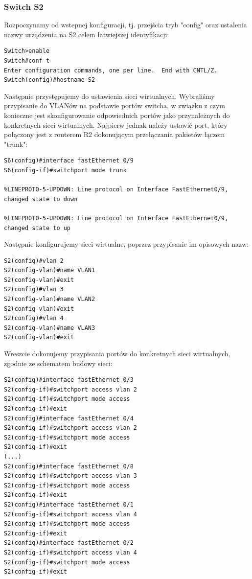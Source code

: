 \documentclass[polish,11pt,a4paper,twoside]{article}
\begin{document}
\subsubsection{Switch S2}

Rozpoczynamy od wstepnej konfiguracji, tj. przejścia tryb "config" oraz ustalenia nazwy urządzenia na S2 celem łatwiejszej identyfikacji:
\begin{lstlisting}
Switch>enable
Switch#conf t
Enter configuration commands, one per line.  End with CNTL/Z.
Switch(config)#hostname S2
\end{lstlisting}
Następnie przystępujemy do ustawienia sieci wirtualnych. Wybraliśmy przypisanie do VLANów na podstawie portów switcha, w związku z czym konieczne jest skonfigurowanie odpowiednich portów jako przynależnych do konkretnych sieci wirtualnych. Najpierw jednak należy ustawić port, który połączony jest z routerem R2 dokonującym przełączania pakietów łączem "trunk":
\begin{lstlisting}
S6(config)#interface fastEthernet 0/9
S6(config-if)#switchport mode trunk 

%LINEPROTO-5-UPDOWN: Line protocol on Interface FastEthernet0/9, changed state to down

%LINEPROTO-5-UPDOWN: Line protocol on Interface FastEthernet0/9, changed state to up
\end{lstlisting}
Następnie konfigurujemy sieci wirtualne, poprzez przypisanie im opisowych nazw:
\begin{lstlisting}
S2(config)#vlan 2
S2(config-vlan)#name VLAN1
S2(config-vlan)#exit
S2(config)#vlan 3
S2(config-vlan)#name VLAN2
S2(config-vlan)#exit
S2(config)#vlan 4
S2(config-vlan)#name VLAN3
S2(config-vlan)#exit
\end{lstlisting}
Wreszcie dokonujemy przypisania portów do konkretnych sieci wirtualnych, zgodnie ze schematem budowy sieci:
\begin{lstlisting}
S2(config)#interface fastEthernet 0/3
S2(config-if)#switchport access vlan 2
S2(config-if)#switchport mode access 
S2(config-if)#exit
S2(config)#interface fastEthernet 0/4
S2(config-if)#switchport access vlan 2
S2(config-if)#switchport mode access 
S2(config-if)#exit
(...)
S2(config)#interface fastEthernet 0/8
S2(config-if)#switchport access vlan 3
S2(config-if)#switchport mode access 
S2(config-if)#exit
S2(config)#interface fastEthernet 0/1
S2(config-if)#switchport access vlan 4
S2(config-if)#switchport mode access 
S2(config-if)#exit
S2(config)#interface fastEthernet 0/2
S2(config-if)#switchport access vlan 4
S2(config-if)#switchport mode access 
S2(config-if)#exit
\end{lstlisting}
\end{document}
